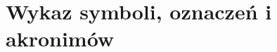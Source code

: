 \documentclass[../main.tex]{subfiles}
\begin{document}
\section{Wykaz symboli, oznaczeń i akronimów}
\end{document}
